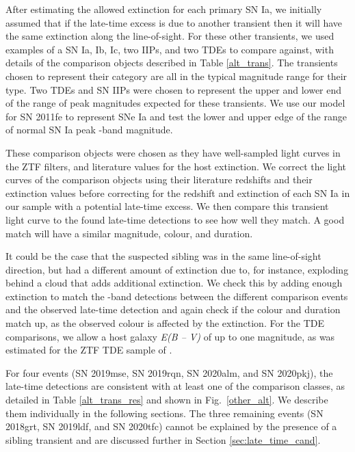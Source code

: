 \documentclass[a4paper,oneside,12pt, class=Latex/Classes/PhDthesisPSnPDF, crop=false]{standalone}
\begin{document}
After estimating the allowed extinction for each primary SN Ia, we initially assumed that if the late-time excess is due to another transient then it will have the same extinction along the line-of-sight. For these other transients, we used examples of a SN Ia, Ib, Ic, two IIPs, and two TDEs to compare against, with details of the comparison objects described in Table \ref{alt_trans}. The transients chosen to represent their category are all in the typical magnitude range for their type. Two TDEs and SN IIPs were chosen to represent the upper and lower end of the range of peak magnitudes expected for these transients. We use our model for SN 2011fe to represent SNe Ia and test the lower and upper edge of the range of normal SN Ia peak \ztfr-band magnitude.

These comparison objects were chosen as they have well-sampled light curves in the ZTF filters, and literature values for the host extinction. We correct the light curves of the comparison objects using their literature redshifts and their extinction values before correcting for the redshift and extinction of each SN Ia in our sample with a potential late-time excess. We then compare this transient light curve to the found late-time detections to see how well they match. A good match will have a similar magnitude, colour, and duration. 

It could be the case that the suspected sibling was in the same line-of-sight direction, but had a different amount of extinction due to, for instance, exploding behind a cloud that adds additional extinction. We check this by adding enough extinction to match the \ztfr-band detections between the different comparison events and the observed late-time detection and again check if the colour and duration match up, as the observed colour is affected by the extinction. For the TDE comparisons, we allow a host galaxy \textit{E(B -- V)} of up to one magnitude, as was estimated for the ZTF TDE sample of \citet{TDE_host_ext_range}.

For four events (SN 2019mse, SN 2019rqn, SN 2020alm, and SN 2020pkj), the late-time detections are consistent with at least one of the comparison classes, as detailed in Table \ref{alt_trans_res} and shown in Fig.~\ref{other_alt}. We describe them individually in the following sections. The three remaining events (SN 2018grt, SN 2019ldf, and SN 2020tfc) cannot be explained by the presence of a sibling transient and are discussed further in Section \ref{sec:late_time_cand}.
\end{document}
